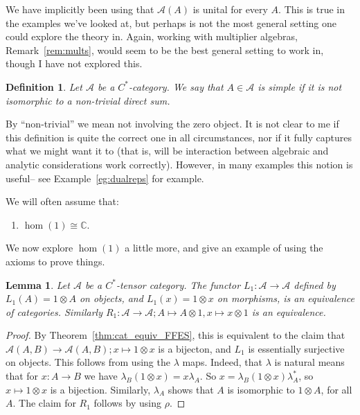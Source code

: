 \documentclass[a4paper,11pt]{article}
\theoremstyle{plain}
\newtheorem{lemma}[proposition]{Lemma}
\newtheorem{definition}[proposition]{Definition}
\theoremstyle{remark}
\newenvironment{remark}
  {\pushQED{\qed}\renewcommand{\qedsymbol}{$\triangle$}\remarkx}
  {\popQED\endremarkx}
\newcommand{\mc}[1]{\mathcal{#1}}
\begin{document}
\begin{remark}
We have implicitly been using that $\mc A(A)$ is unital for every $A$.  This is true in the examples we've looked at, but perhaps is not the most general setting one could explore the theory in.  Again, working with multiplier algebras, Remark~\ref{rem:mults}, would seem to be the best general setting to work in, though I have not explored this.
\end{remark}

\begin{definition}
Let $\mc A$ be a $C^*$-category.  We say that $A\in\mc A$ is \emph{simple} if it is not isomorphic to a non-trivial direct sum.
\end{definition}

By ``non-trivial'' we mean not involving the zero object.  It is not clear to me if this definition is quite the correct one in all circumstances, nor if it fully captures what we might want it to (that is, will be interaction between algebraic and analytic considerations work correctly).  However, in many examples this notion is useful-- see Example~\ref{eg:dualreps} for example.

We will often assume that:

\begin{enumerate}[(1), start=11]
  \item\label{cst-axioms:11} $\hom(1) \cong \mathbb C$.
\end{enumerate}

We now explore $\hom(1)$ a little more, and give an example of using the axioms to prove things.

\begin{lemma}\label{lem:L1_R1_equivs}
Let $\mc A$ be a $C^*$-tensor category.  The functor $L_1 \colon \mc A\to\mc A$ defined by $L_1(A) = 1\otimes A$ on objects, and $L_1(x)=1\otimes x$ on morphisms, is an equivalence of categories.  Similarly $R_1 \colon \mc A\to\mc A; A\mapsto A\otimes 1, x\mapsto x\otimes 1$ is an equivalence.
\end{lemma}
\begin{proof}
By Theorem~\ref{thm:cat_equiv_FFES}, this is equivalent to the claim that $\mc A(A,B) \to \mc A(A,B); x\mapsto 1\otimes x$ is a bijecton, and $L_1$ is essentially surjective on objects.  This follows from using the $\lambda$ maps.  Indeed, that $\lambda$ is natural means that for $x\colon A\to B$ we have $\lambda_B(1\otimes x) = x\lambda_A$.  So $x = \lambda_B(1\otimes x)\lambda_A^*$, so $x\mapsto 1\otimes x$ is a bijection.  Similarly, $\lambda_A$ shows that $A$ is isomorphic to $1\otimes A$, for all $A$.  The claim for $R_1$ follows by using $\rho$.
\end{proof}
\end{document}
